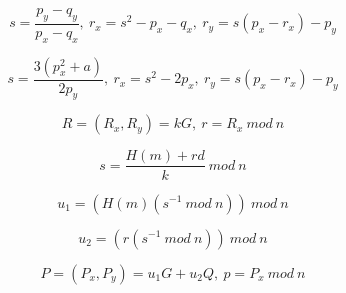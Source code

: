 \documentclass{article}
\begin{document}
\[
s = \frac{p_y-q_y}{p_x-q_x},\ 
r_x = s^2-p_x-q_x,\ 
r_y = s(p_x-r_x)-p_y
\]

\[
s = \frac{3(p_x^2+a)}{2p_y},\ 
r_x = s^2-2p_x,\ 
r_y = s(p_x-r_x)-p_y
\]

\[
R = (R_x, R_y) = kG,\ 
r = R_x\ mod\ n
\]

\[
s = \frac{H(m)+rd}{k}\ mod\ n
\]

\[
u_1 = (H(m)(s^{-1}\ mod\ n))\ mod\ n
\]

\[
u_2 = (r(s^{-1}\ mod\ n))\ mod\ n
\]

\[
P = (P_x, P_y) = u_1 G + u_2 Q,\ p = P_x\ mod\ n
\]
\end{document}
